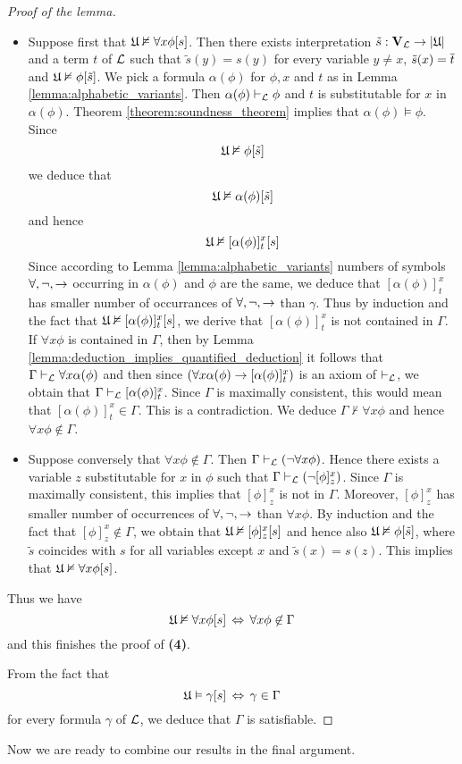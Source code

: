 \documentclass[10pt]{amsart}
\begin{document}
\begin{proof}[Proof of the lemma]
\begin{enumerate}[label=\textbf{(\arabic*)}, leftmargin=3.0em]
		      \begin{itemize}
			      \item Suppose first that ${\mathfrak U} \nvDash \forall x\phi[s]$. Then there exists interpretation $\tilde{s}:\mathbf{V}_{{\mathcal L}} \rightarrow |{\mathfrak U}|$ and a term $t$ of ${\mathcal L}$ such that $\tilde{s}(y) = s(y)$ for every variable $y \neq x$, $\tilde{s}(x) = \overline{t}$ and ${\mathfrak U} \nvDash \phi[\tilde{s}]$. We pick a formula $\alpha(\phi)$ for $\phi, x$ and $t$ as in Lemma \ref{lemma:alphabetic_variants}. Then $\alpha(\phi) \vdash_{{\mathcal L}} \phi$ and $t$ is substitutable for $x$ in $\alpha(\phi)$. Theorem \ref{theorem:soundness_theorem} implies that $\alpha(\phi) \vDash \phi$. Since
			            $${\mathfrak U} \nvDash \phi[\tilde{s}]$$
			            we deduce that
			            $${\mathfrak U} \nvDash \alpha(\phi)[\tilde{s}]$$
			            and hence
			            $${\mathfrak U} \nvDash [\alpha(\phi)]^x_t[s]$$
			            Since according to Lemma \ref{lemma:alphabetic_variants} numbers of symbols $\forall , \neg, \rightarrow$ occurring in $\alpha(\phi)$ and $\phi$ are the same, we deduce that $[\alpha(\phi)]^x_t$ has smaller number of occurrances of $\forall , \neg, \rightarrow$ than $\gamma$. Thus by induction and the fact that ${\mathfrak U} \nvDash [\alpha(\phi)]^x_t[s]$, we derive that $[\alpha(\phi)]^x_t$ is not contained in $\Gamma$. If $\forall x \phi$ is contained in $\Gamma$, then by Lemma \ref{lemma:deduction_implies_quantified_deduction} it follows that $\Gamma \vdash_{{\mathcal L}} \forall x\alpha(\phi)$ and then since $(\forall x\alpha(\phi) \rightarrow [\alpha(\phi)]^x_t)$ is an axiom of $\vdash_{{\mathcal L}}$, we obtain that $\Gamma \vdash_{{\mathcal L}} [\alpha(\phi)]^x_t$. Since $\Gamma$ is maximally consistent, this would mean that $[\alpha(\phi)]^x_t \in \Gamma$. This is a contradiction. We deduce $\Gamma \nvdash \forall x\phi$ and hence $\forall x\phi \not \in \Gamma$.
			      \item Suppose conversely that $\forall x\phi \not \in  \Gamma$. Then $\Gamma \vdash_{{\mathcal L}} (\neg\forall x\phi)$. Hence there exists a variable $z$ substitutable for $x$ in $\phi$ such that $\Gamma \vdash_{{\mathcal L}} (\neg[\phi]^x_z)$. Since $\Gamma$ is maximally consistent, this implies that $[\phi]^x_z$ is not in $\Gamma$. Moreover, $[\phi]^x_z$ has smaller number of occurrences of $\forall , \neg, \rightarrow$ than $\forall x\phi$. By induction and the fact that $[\phi]^x_z \not \in  \Gamma$, we obtain that ${\mathfrak U} \nvDash [\phi]^x_z[s]$ and hence also ${\mathfrak U} \nvDash \phi[\tilde{s}]$, where $\tilde{s}$ coincides with $s$ for all variables except $x$ and $\tilde{s}(x) =
				            s(z)$. This implies that ${\mathfrak U} \nvDash \forall x\phi[s]$.
		      \end{itemize}
		      Thus we have
		      $${\mathfrak U} \nvDash \forall x\phi[s] \,\Leftrightarrow\, \forall x\phi \not \in \Gamma$$
		      and this finishes the proof of \textbf{(4)}.
	\end{enumerate}
	From the fact that
	$${\mathfrak U} \vDash \gamma[s] \,\Leftrightarrow\, \gamma \in \Gamma$$
	for every formula $\gamma$ of ${\mathcal L}$, we deduce that $\Gamma$ is satisfiable.
\end{proof}
\noindent
Now we are ready to combine our results in the final argument.
\end{document}
